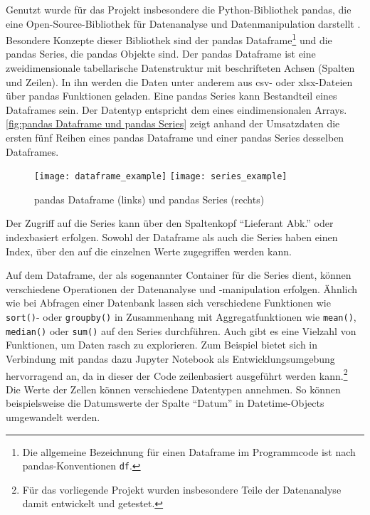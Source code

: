     Genutzt wurde für das Projekt insbesondere die Python-Bibliothek pandas, die eine Open-Source-Bibliothek für Datenanalyse und 
    Datenmanipulation darstellt \cite[vgl.][]{pandas_pandas_2021}. 
    Besondere Konzepte dieser Bibliothek sind der pandas Dataframe\footnote{ Die allgemeine Bezeichnung für einen Dataframe im Programmcode ist nach pandas-Konventionen \texttt{df}.} und die pandas Series, die pandas Objekte sind. Der pandas Dataframe ist eine zweidimensionale 
    tabellarische Datenstruktur mit beschrifteten Achsen (Spalten und Zeilen). In ihn
    werden die Daten unter anderem aus csv- oder xlsx-Dateien über pandas Funktionen geladen.
    Eine pandas Series kann Bestandteil eines Dataframes sein. Der Datentyp entspricht dem eines eindimensionalen Arrays. 
    \autoref{fig:pandas Dataframe und pandas Series} zeigt anhand der Umsatzdaten die ersten fünf Reihen
    eines pandas Dataframe und einer pandas Series desselben Dataframes. 
    
    
    \begin{figure}[H]
        \centering
            \texttt{[image: dataframe\_example]}
            \hspace{1cm}
            \texttt{[image: series\_example]}
            \caption{pandas Dataframe (links) und pandas Series (rechts)}
            \label{fig:pandas Dataframe und pandas Series}
    \end{figure}

    Der Zugriff auf die Series kann über den Spaltenkopf \enquote{Lieferant Abk.} oder indexbasiert erfolgen. 
    Sowohl der Dataframe als auch die Series haben einen Index, über den auf die einzelnen Werte zugegriffen werden kann. 
    
    Auf dem Dataframe, der als sogenannter Container für die Series dient, können verschiedene Operationen der Datenanalyse und 
    -manipulation erfolgen. Ähnlich wie bei Abfragen einer Datenbank lassen sich verschiedene Funktionen wie \texttt{sort()}- oder \texttt{groupby()}
    in Zusammenhang mit Aggregatfunktionen wie \texttt{mean()}, \texttt{median()} oder \texttt{sum()} auf den Series durchführen.
    Auch gibt es eine Vielzahl von Funktionen, um Daten rasch zu explorieren. Zum Beispiel bietet sich in Verbindung mit pandas dazu Jupyter Notebook als
    Entwicklungsumgebung hervorragend an, da in dieser der Code zeilenbasiert ausgeführt werden kann.\footnote{ Für das vorliegende Projekt wurden 
    insbesondere Teile der Datenanalyse damit entwickelt und getestet.} Die Werte der Zellen können verschiedene Datentypen
    annehmen. So können beispielsweise die Datumswerte der Spalte \enquote{Datum} in Datetime-Objects umgewandelt werden.

